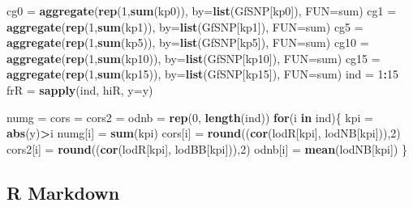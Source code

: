 \documentclass[]{article}
\newenvironment{Shaded}{\begin{snugshade}}{\end{snugshade}}
\newcommand{\KeywordTok}[1]{\textcolor[rgb]{0.13,0.29,0.53}{\textbf{#1}}}
\newcommand{\DataTypeTok}[1]{\textcolor[rgb]{0.13,0.29,0.53}{#1}}
\newcommand{\DecValTok}[1]{\textcolor[rgb]{0.00,0.00,0.81}{#1}}
\newcommand{\StringTok}[1]{\textcolor[rgb]{0.31,0.60,0.02}{#1}}
\newcommand{\ControlFlowTok}[1]{\textcolor[rgb]{0.13,0.29,0.53}{\textbf{#1}}}
\newcommand{\OperatorTok}[1]{\textcolor[rgb]{0.81,0.36,0.00}{\textbf{#1}}}
\newcommand{\NormalTok}[1]{#1}
\begin{document}
\begin{Shaded}
\begin{Highlighting}[]
\NormalTok{cg0 =}\StringTok{ }\KeywordTok{aggregate}\NormalTok{(}\KeywordTok{rep}\NormalTok{(}\DecValTok{1}\NormalTok{,}\KeywordTok{sum}\NormalTok{(kp0)), }\DataTypeTok{by=}\KeywordTok{list}\NormalTok{(GfSNP[kp0]), }\DataTypeTok{FUN=}\NormalTok{sum)}
\NormalTok{cg1 =}\StringTok{ }\KeywordTok{aggregate}\NormalTok{(}\KeywordTok{rep}\NormalTok{(}\DecValTok{1}\NormalTok{,}\KeywordTok{sum}\NormalTok{(kp1)), }\DataTypeTok{by=}\KeywordTok{list}\NormalTok{(GfSNP[kp1]), }\DataTypeTok{FUN=}\NormalTok{sum)}
\NormalTok{cg5 =}\StringTok{ }\KeywordTok{aggregate}\NormalTok{(}\KeywordTok{rep}\NormalTok{(}\DecValTok{1}\NormalTok{,}\KeywordTok{sum}\NormalTok{(kp5)), }\DataTypeTok{by=}\KeywordTok{list}\NormalTok{(GfSNP[kp5]), }\DataTypeTok{FUN=}\NormalTok{sum)}
\NormalTok{cg10 =}\StringTok{ }\KeywordTok{aggregate}\NormalTok{(}\KeywordTok{rep}\NormalTok{(}\DecValTok{1}\NormalTok{,}\KeywordTok{sum}\NormalTok{(kp10)), }\DataTypeTok{by=}\KeywordTok{list}\NormalTok{(GfSNP[kp10]), }\DataTypeTok{FUN=}\NormalTok{sum)}
\NormalTok{cg15 =}\StringTok{ }\KeywordTok{aggregate}\NormalTok{(}\KeywordTok{rep}\NormalTok{(}\DecValTok{1}\NormalTok{,}\KeywordTok{sum}\NormalTok{(kp15)), }\DataTypeTok{by=}\KeywordTok{list}\NormalTok{(GfSNP[kp15]), }\DataTypeTok{FUN=}\NormalTok{sum)}
\NormalTok{ind =}\StringTok{ }\DecValTok{1}\OperatorTok{:}\DecValTok{15}
\NormalTok{frR =}\StringTok{ }\KeywordTok{sapply}\NormalTok{(ind, hiR, }\DataTypeTok{y=}\NormalTok{y)}

\NormalTok{numg =}\StringTok{ }\NormalTok{cors =}\StringTok{ }\NormalTok{cors2 =}\StringTok{ }\NormalTok{odnb =}\StringTok{ }\KeywordTok{rep}\NormalTok{(}\DecValTok{0}\NormalTok{, }\KeywordTok{length}\NormalTok{(ind))}
\ControlFlowTok{for}\NormalTok{(i }\ControlFlowTok{in}\NormalTok{ ind)\{}
\NormalTok{  kpi =}\StringTok{ }\KeywordTok{abs}\NormalTok{(y)}\OperatorTok{>}\NormalTok{i}
\NormalTok{  numg[i] =}\StringTok{ }\KeywordTok{sum}\NormalTok{(kpi)}
\NormalTok{  cors[i] =}\StringTok{ }\KeywordTok{round}\NormalTok{((}\KeywordTok{cor}\NormalTok{(lodR[kpi], lodNB[kpi])),}\DecValTok{2}\NormalTok{)}
\NormalTok{  cors2[i] =}\StringTok{ }\KeywordTok{round}\NormalTok{((}\KeywordTok{cor}\NormalTok{(lodR[kpi], lodBB[kpi])),}\DecValTok{2}\NormalTok{)}
\NormalTok{  odnb[i] =}\StringTok{ }\KeywordTok{mean}\NormalTok{(lodNB[kpi])}
\NormalTok{\}}
\end{Highlighting}
\end{Shaded}

\subsection{R Markdown}\label{r-markdown}
\end{document}
